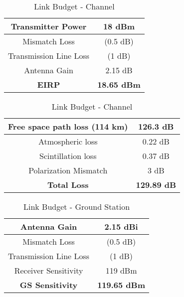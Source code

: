 \begin{table}[!htb]
  \begin{minipage}{.49\textwidth}
      \centering
      \renewcommand{\arraystretch}{1.2}
      \begin{tabular}{ |c|c| }
      \hline
      Transmitter Power             & 18 dBm                    \\ \hline
      Mismatch Loss                 & (0.5 dB)                 \\ \hline
      Transmission Line Loss        & (1 dB)                  \\ \hline
      Antenna Gain                  & 2.15 dB                   \\ \hline
      \textbf{EIRP}                 & \textbf{18.65 dBm}        \\ \hline
      \end{tabular}
      \caption{Link Budget - Satellite}
      \label{tab:link_budget_satellite}
  \end{minipage}
  \begin{minipage}{.49\textwidth}
      \centering
      \renewcommand{\arraystretch}{1.2}
      \begin{tabular}{ |c|c| }
      \hline
      Free space path loss (114 km) & 126.3 dB                  \\ \hline
      Atmospheric loss              & 0.22 dB                   \\ \hline
      Scintillation loss            & 0.37 dB                   \\ \hline
      Polarization Mismatch         & 3 dB                      \\ \hline
      \textbf{Total Loss}           & \textbf{129.89 dB}         \\ \hline
      \end{tabular}
      \caption{Link Budget - Channel}
      \label{tab:link_budget_channel}
  \end{minipage}
\end{table}



\begin{table}[!htb]
  \centering
  \renewcommand{\arraystretch}{1.2}
  \begin{tabular}{ |c|c| }
  \hline
  Antenna Gain                  & 2.15 dBi                \\ \hline
  Mismatch Loss                 & (0.5 dB)                \\ \hline
  Transmission Line Loss        & (1 dB)                  \\ \hline
  Receiver Sensitivity          & 119 dBm                 \\ \hline
  \textbf{GS Sensitivity}       & \textbf{119.65 dBm}     \\ \hline
  \end{tabular}
  \caption{Link Budget - Ground Station}
  \label{tab:link_budget_gs}
\end{table}

